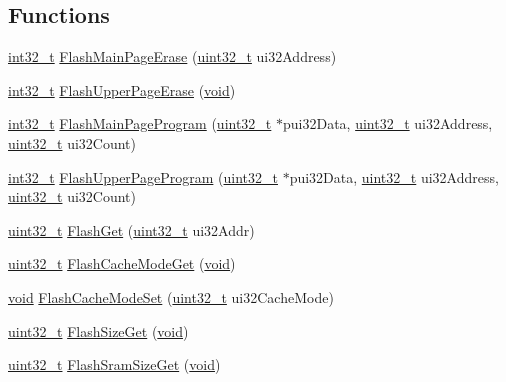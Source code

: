 \subsection*{Functions}
\begin{DoxyCompactItemize}
\item 
\hyperlink{_p_e___types_8h_adb828ef50c2dbb783109824e94cf6c47}{int32\+\_\+t} \hyperlink{group__flash__api_gaedcc8d25fdce7a51b46e6d37629dbef3}{Flash\+Main\+Page\+Erase} (\hyperlink{_p_e___types_8h_a33594304e786b158f3fb30289278f5af}{uint32\+\_\+t} ui32\+Address)
\item 
\hyperlink{_p_e___types_8h_adb828ef50c2dbb783109824e94cf6c47}{int32\+\_\+t} \hyperlink{group__flash__api_ga67d5a1a47713df085c99877079365f04}{Flash\+Upper\+Page\+Erase} (\hyperlink{usb__devapi_8h_afabf60e7f57651d6d595a02c75f07cd0}{void})
\item 
\hyperlink{_p_e___types_8h_adb828ef50c2dbb783109824e94cf6c47}{int32\+\_\+t} \hyperlink{group__flash__api_ga15cabe29d0066e6c37e0ccfd452e6adc}{Flash\+Main\+Page\+Program} (\hyperlink{_p_e___types_8h_a33594304e786b158f3fb30289278f5af}{uint32\+\_\+t} $\ast$pui32\+Data, \hyperlink{_p_e___types_8h_a33594304e786b158f3fb30289278f5af}{uint32\+\_\+t} ui32\+Address, \hyperlink{_p_e___types_8h_a33594304e786b158f3fb30289278f5af}{uint32\+\_\+t} ui32\+Count)
\item 
\hyperlink{_p_e___types_8h_adb828ef50c2dbb783109824e94cf6c47}{int32\+\_\+t} \hyperlink{group__flash__api_ga2a92b46846b2919278a852f0a4b1ffcf}{Flash\+Upper\+Page\+Program} (\hyperlink{_p_e___types_8h_a33594304e786b158f3fb30289278f5af}{uint32\+\_\+t} $\ast$pui32\+Data, \hyperlink{_p_e___types_8h_a33594304e786b158f3fb30289278f5af}{uint32\+\_\+t} ui32\+Address, \hyperlink{_p_e___types_8h_a33594304e786b158f3fb30289278f5af}{uint32\+\_\+t} ui32\+Count)
\item 
\hyperlink{_p_e___types_8h_a33594304e786b158f3fb30289278f5af}{uint32\+\_\+t} \hyperlink{group__flash__api_gaec19050e37101a648c689b3f40d8da90}{Flash\+Get} (\hyperlink{_p_e___types_8h_a33594304e786b158f3fb30289278f5af}{uint32\+\_\+t} ui32\+Addr)
\item 
\hyperlink{_p_e___types_8h_a33594304e786b158f3fb30289278f5af}{uint32\+\_\+t} \hyperlink{group__flash__api_gac9664ecdcf054a53ec8e6d896cc3753c}{Flash\+Cache\+Mode\+Get} (\hyperlink{usb__devapi_8h_afabf60e7f57651d6d595a02c75f07cd0}{void})
\item 
\hyperlink{usb__devapi_8h_afabf60e7f57651d6d595a02c75f07cd0}{void} \hyperlink{group__flash__api_gae786aab0fb4bcec9149c918c09fafa15}{Flash\+Cache\+Mode\+Set} (\hyperlink{_p_e___types_8h_a33594304e786b158f3fb30289278f5af}{uint32\+\_\+t} ui32\+Cache\+Mode)
\item 
\hyperlink{_p_e___types_8h_a33594304e786b158f3fb30289278f5af}{uint32\+\_\+t} \hyperlink{group__flash__api_ga79bccd4cdbd7930d880df9e185935d41}{Flash\+Size\+Get} (\hyperlink{usb__devapi_8h_afabf60e7f57651d6d595a02c75f07cd0}{void})
\item 
\hyperlink{_p_e___types_8h_a33594304e786b158f3fb30289278f5af}{uint32\+\_\+t} \hyperlink{group__flash__api_gad3d3b9146ff61723dddacaa27b82385c}{Flash\+Sram\+Size\+Get} (\hyperlink{usb__devapi_8h_afabf60e7f57651d6d595a02c75f07cd0}{void})
\end{DoxyCompactItemize}
